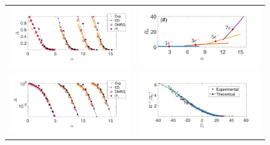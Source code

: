 \documentclass[prb,twocolumn,showpacs,preprintnumbers,amsmath,amssymb, superscriptaddress]{revtex4-2}
\newcommand{\1}{{1\hspace*{-0.5ex} \textrm{l} \hspace*{0.5ex}}}
\begin{document}
\begin{figure}[h!]
    \begin{center}
    	\begin{tabular}{cc}
    		\includegraphics[width=1\columnwidth]{Fig_spectral_gap_exp_fitted_lin}&
    		\includegraphics[width=1\columnwidth]{Fig_perpfactors}\\
  			\includegraphics[width=1\columnwidth]{Fig_spectral_gap_exp_fitted_log}&
     		\includegraphics[width=1\columnwidth]{Fig_spectral_gap_exp_log_lin_shahal_scaling_log}
    	\end{tabular}
    	



\end{center}
\end{figure}
\end{document}
